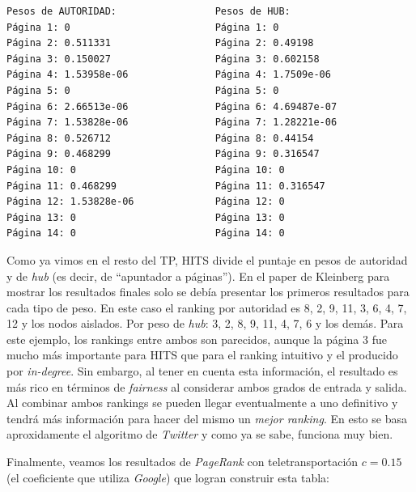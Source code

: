 \begin{verbatim}
Pesos de AUTORIDAD:	                Pesos de HUB:
Página 1: 0                         Página 1: 0
Página 2: 0.511331                  Página 2: 0.49198
Página 3: 0.150027                  Página 3: 0.602158
Página 4: 1.53958e-06               Página 4: 1.7509e-06
Página 5: 0                         Página 5: 0
Página 6: 2.66513e-06               Página 6: 4.69487e-07
Página 7: 1.53828e-06               Página 7: 1.28221e-06
Página 8: 0.526712                  Página 8: 0.44154
Página 9: 0.468299                  Página 9: 0.316547
Página 10: 0                        Página 10: 0
Página 11: 0.468299                 Página 11: 0.316547
Página 12: 1.53828e-06              Página 12: 0
Página 13: 0                        Página 13: 0
Página 14: 0                        Página 14: 0
\end{verbatim}

Como ya vimos en el resto del TP, HITS divide el puntaje en pesos de autoridad y de \textit{hub} (es decir, de ``apuntador a páginas''). En el paper de Kleinberg para mostrar los resultados finales solo se debía presentar los primeros resultados para cada tipo de peso. En este caso el ranking por autoridad es 8, 2, 9, 11, 3, 6, 4, 7, 12 y los nodos aislados. Por peso de \textit{hub}: 3, 2, 8, 9, 11, 4, 7, 6 y los demás. Para este ejemplo, los rankings entre ambos son parecidos, aunque la página 3 fue mucho más importante para HITS que para el ranking intuitivo y el producido por \textit{in-degree}. Sin embargo, al tener en cuenta esta información, el resultado es más rico en términos de \textit{fairness} al considerar ambos grados de entrada y salida. Al combinar ambos rankings se pueden llegar eventualmente a uno definitivo y tendrá más información para hacer del mismo un \textit{mejor ranking}. En esto se basa aproxidamente el algoritmo de \textit{Twitter} y como ya se sabe, funciona muy bien. 

Finalmente, veamos los resultados de \textit{PageRank} con teletransportación $c = 0.15$ (el coeficiente que utiliza \textit{Google}) que logran construir esta tabla:

